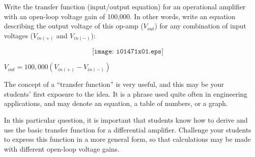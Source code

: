 

Write the transfer function (input/output equation) for an operational amplifier with an open-loop voltage gain of 100,000.  In other words, write an equation describing the output voltage of this op-amp ($V_{out}$) for any combination of input voltages ($V_{in(+)}$ and $V_{in(-)}$):

$$\texttt{[image: i01471x01.eps]}$$







$V_{out} = 100,000(V_{in(+)} - V_{in(-)})$







The concept of a ``transfer function'' is very useful, and this may be your students' first exposure to the idea.  It is a phrase used quite often in engineering applications, and may denote an equation, a table of numbers, or a graph.

In this particular question, it is important that students know how to derive and use the basic transfer function for a differential amplifier.  Challenge your students to express this function in a more general form, so that calculations may be made with different open-loop voltage gains.




